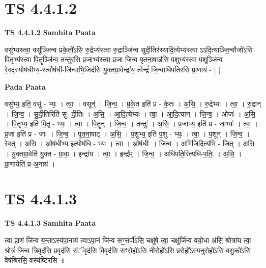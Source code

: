 \documentclass[17pt]{extarticle}
\begin{document}
\section{ TS 4.4.1.2 }

\textbf{TS 4.4.1.2 } \newline
\textbf{Samhita Paata} \newline

वसु॑भ्यस्त्वा॒ वसू᳚ञ्जिन्व प्रके॒तो॑ऽसि रु॒द्रेभ्य॑स्त्वा रु॒द्राञ्जि॑न्व सुदी॒तिर॑स्यादि॒त्येभ्य॑स्त्वा ऽऽदि॒त्याञ्जि॒न्वौजो॑ऽसि पि॒तृभ्य॑स्त्वा पि॒तॄञ्जि॑न्व॒ तन्तु॑रसि प्र॒जाभ्य॑स्त्वा प्र॒जा जि॑न्व पृतना॒षाड॑सि प॒शुभ्य॑स्त्वा प॒शूञ्जि॑न्व रे॒वद॒स्योष॑धीभ्य॒-स्त्वौष॑धी-र्जिन्वाभि॒जिद॑सि यु॒क्तग्रा॒वेन्द्रा॑य॒ त्वेन्द्रं॑ जि॒न्वाधि॑पतिरसि प्रा॒णाय॑ - [  ] \newline

\textbf{Pada Paata} \newline

वसु॑भ्य॒ इति॒ वसु॑ - भ्यः॒ । त्वा॒ । वसून्॑ । जि॒न्व॒ । प्र॒के॒त इति॑ प्र - के॒तः । अ॒सि॒ । रु॒द्रेभ्यः॑ । त्वा॒ । रु॒द्रान् । जि॒न्व॒ । सु॒दी॒तिरिति॑ सु- दी॒तिः । अ॒सि॒ । आ॒दि॒त्येभ्यः॑ । त्वा॒ । आ॒दि॒त्यान् । जि॒न्व॒ । ओजः॑ । अ॒सि॒ । पि॒तृभ्य॒ इति॑ पि॒तृ - भ्यः॒ । त्वा॒ । पि॒तॄन् । जि॒न्व॒ । तन्तुः॑ । अ॒सि॒ । प्र॒जाभ्य॒ इति॑ प्र - जाभ्यः॑ । त्वा॒ । प्र॒जा इति॑ प्र - जाः । जि॒न्व॒ । पृ॒त॒ना॒षाट् । अ॒सि॒ । प॒शुभ्य॒ इति॑ प॒शु - भ्यः॒ । त्वा॒ । प॒शून् । जि॒न्व॒ । रे॒वत् । अ॒सि॒ । ओष॑धीभ्य॒ इत्योष॑धि - भ्यः॒ । त्वा॒ । ओष॑धीः । जि॒न्व॒ । अ॒भि॒जिदित्य॑भि - जित् । अ॒सि॒ । यु॒क्तग्रा॒वेति॑ यु॒क्त - ग्रा॒वा॒ । इन्द्रा॑य । त्वा॒ । इन्द्र᳚म् । जि॒न्व॒ । अधि॑पति॒रित्यधि॑-प॒तिः॒ । अ॒सि॒ । प्रा॒णायेति॑ प्र-अ॒नाय॑ ।  \newline





\section{ TS 4.4.1.3 }

\textbf{TS 4.4.1.3 } \newline
\textbf{Samhita Paata} \newline

त्वा प्रा॒णं जि॑न्व य॒न्ताऽस्य॑पा॒नाय॑ त्वाऽपा॒नं जि॑न्व सꣳ॒॒सर्पो॑ऽसि॒ चक्षु॑षे त्वा॒ चक्षु॑र्जिन्व वयो॒धा अ॑सि॒ श्रोत्रा॑य त्वा॒ श्रोत्रं॑ जिन्व त्रि॒वृद॑सि प्र॒वृद॑सि सं॒ॅवृद॑सि वि॒वृद॑सि सꣳरो॒हो॑ऽसि नीरो॒हो॑ऽसि प्ररो॒हो᳚ऽस्यनुरो॒हो॑ऽसि वसु॒को॑ऽसि॒ वेष॑श्रिरसि॒ वस्य॑ष्टिरसि ॥ \newline
\end{document}
